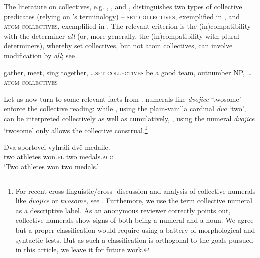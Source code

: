 \documentclass[output=paper,colorlinks,citecolor=brown,newtxmath]{langscibook}
\begin{document}
\z

\noindent The literature on collectives, e.g. \citet{Dowty1987}, \citet{Winter2002}, and \citet{Brisson2003}, distinguishes two types of collective predicates (relying on \citeauthor{Winter2002}'s terminology) -- \textsc{set collectives}, exemplified in , and \textsc{atom collectives}, exemplified in . The relevant criterion is the (in)compatibility with the determiner \textit{all} (or, more generally, the (in)compatibility with plural determiners), whereby set collectives, but not atom collectives, can involve modification by \textit{all}; see .

\ea \ea\label{ex:line241-a} gather, meet, sing together, \ldots{}\hfill \textsc{set collectives}
\ex\label{ex:line241-b} be a good team, outnumber NP, \ldots{}\hfill \textsc{atom collectives}
\z\z

\ea\label{ex:line246}
\z\z

\noindent Let us now turn to some relevant facts from .  numerals like \textit{dvojice} `twosome' enforce the collective reading: while , using the plain-vanilla cardinal \textit{dva} `two', can be interpreted collectively as well as cumulatively, , using the numeral \textit{dvojice} `twosome' only allows the collective construal.\footnote{For recent cross-linguistic/cross- discussion and analysis of collective numerals like \textit{dvojice} or \textit{twosome,} see \citet{Grimm.Docekaltoappear}. Furthemore, we use the term collective numeral as a descriptive label. As an anonymous reviewer correctly points out,  collective numerals show signs of both being a numeral and a noun. We agree but a proper classification would require using a battery of morphological and syntactic tests. But as such a classification is orthogonal to the goals pursued in this article, we leave it for future work.}

\ea\label{ex:line256-a}\gll Dva sportovci vyhráli dvě medaile.\\
two athletes won.\textsc{pl} two medals.\textsc{acc}\\
\glt `Two athletes won two medals.'\\
\z\z
\end{document}
